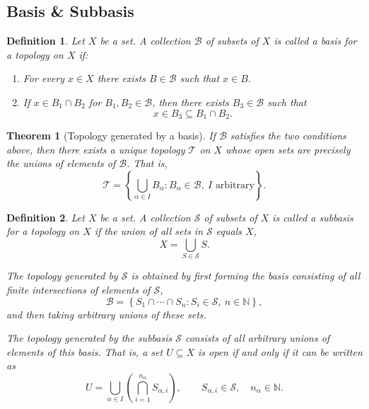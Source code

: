 \documentclass[12pt]{article}
\newtheorem{theorem}{Theorem}
\newtheorem{definition}{Definition}
\begin{document}
\subsection*{Basis \& Subbasis}

\begin{definition}
Let $X$ be a set. A collection $\mathcal{B}$ of subsets of $X$ is called a \emph{basis} for a topology on $X$ if:

\begin{enumerate}[label=(\roman*)]
\item For every $x \in X$ there exists $B \in \mathcal{B}$ such that $x \in B$.

\item If $x \in B_1 \cap B_2$ for $B_1,B_2 \in \mathcal{B}$, then there exists
$B_3 \in \mathcal{B}$ such that
\[
x \in B_3 \subseteq B_1 \cap B_2 .
\]
\end{enumerate}
\end{definition}

\begin{theorem}[Topology generated by a basis]
If $\mathcal{B}$ satisfies the two conditions above, then there exists a unique topology $\mathcal{T}$ on $X$ whose open sets are precisely the unions of elements of $\mathcal{B}$. That is,
\[
\mathcal{T}
=
\left\{
\bigcup_{\alpha \in I} B_\alpha
:
B_\alpha \in \mathcal{B},\ I \text{ arbitrary}
\right\}.
\]
\end{theorem}

\begin{definition}
Let $X$ be a set. A collection $\mathcal{S}$ of subsets of $X$ is called a
\emph{subbasis} for a topology on $X$ if the union of all sets in $\mathcal{S}$ equals $X$,
\[
X = \bigcup_{S \in \mathcal{S}} S.
\]

The topology generated by $\mathcal{S}$ is obtained by first forming the basis
consisting of all finite intersections of elements of $\mathcal{S}$,
\[
\mathcal{B}
=
\left\{
S_1 \cap \cdots \cap S_n :
S_i \in \mathcal{S},\ n \in \mathbb{N}
\right\},
\]
and then taking arbitrary unions of these sets.

The topology generated by the subbasis $\mathcal{S}$ consists of all arbitrary unions of elements of this basis. That is, a set $U \subseteq X$ is open if and only if it can be written as
\[
U
=
\bigcup_{\alpha \in I}
\left(
\bigcap_{i=1}^{n_\alpha} S_{\alpha,i}
\right),
\qquad S_{\alpha,i} \in \mathcal{S},\quad n_\alpha \in \mathbb{N}.
\]

\end{definition}
\end{document}
